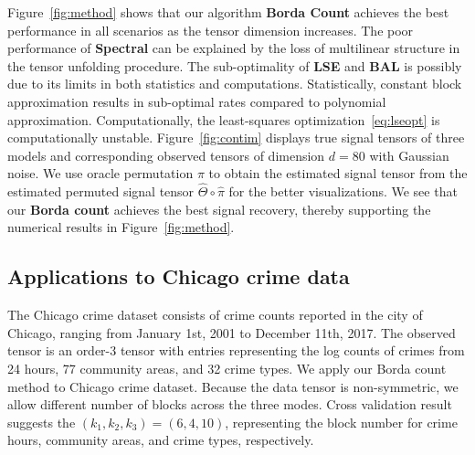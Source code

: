 \documentclass[12pt]{article}
\theoremstyle{definition}
\begin{document}
Figure~\ref{fig:method} shows that our algorithm {\bf \small Borda Count} achieves the best performance in all scenarios as the tensor dimension increases. The poor performance of {\bf \small Spectral} can be explained by the loss of multilinear structure in the tensor unfolding procedure. The sub-optimality of {\bf \small LSE} and {\bf \small BAL} is possibly due to its limits in both statistics and computations. Statistically, constant block approximation results in sub-optimal rates compared to polynomial approximation. Computationally, the least-squares optimization~\eqref{eq:lseopt} is computationally unstable. Figure~\ref{fig:contim} displays true signal tensors of three models and corresponding observed tensors of dimension $d = 80$ with Gaussian noise. We use oracle permutation $\pi$ to obtain the estimated signal tensor from the estimated permuted signal tensor $\hat\Theta\circ\hat\pi$ for the better visualizations. We see that our  {\bf \small Borda count} achieves the best signal recovery, thereby supporting the numerical results in Figure~\ref{fig:method}.



\subsection{Applications to Chicago crime data}
The Chicago crime dataset consists of crime counts reported in the city of Chicago, ranging from January 1st, 2001 to December 11th, 2017. The observed tensor is an order-3 tensor with entries representing the log counts of crimes from 24 hours, 77 community areas, and 32 crime types. We apply our Borda count method to Chicago crime dataset. Because the data tensor is non-symmetric, we allow different number of blocks across the three modes. Cross validation result suggests the $(k_1,k_2,k_3)=(6,4,10)$, representing the block number for crime hours, community areas, and crime types, respectively.
\end{document}
